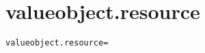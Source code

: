 \section{valueobject.resource}
\label{configuration:ValueobjectResource}
\AvailableInJavaOnly{\TODO}
\begin{lstlisting}[style=Props,caption={Usage example for \textit{valueobject.resource}}]
valueobject.resource=
\end{lstlisting}